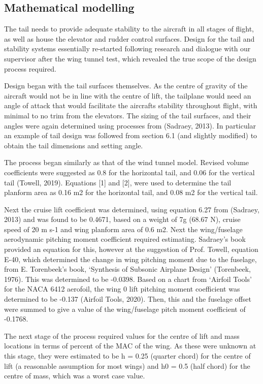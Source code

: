 \documentclass[../../main.tex]{subfiles}
\begin{document}
\subsection{Mathematical modelling} \label{sec:final-design-proposal:tail:mathematical-modelling}

The tail needs to provide adequate stability to the aircraft in all stages of flight, as well as house the elevator and rudder control surfaces.
Design for the tail and stability systems essentially re-started following research and dialogue with our supervisor after the wing tunnel test, which revealed the true scope of the design process required. 

Design began with the tail surfaces themselves.
As the centre of gravity of the aircraft would not be in line with the centre of lift, the tailplane would need an angle of attack that would facilitate the aircrafts stability throughout flight, with minimal to no trim from the elevators.
The sizing of the tail surfaces, and their angles were again determined using processes from (Sadraey, 2013).
In particular an example of tail design was followed from section 6.1 (and slightly modified) to obtain the tail dimensions and setting angle. 

The process began similarly as that of the wind tunnel model.
Revised volume coefficients were suggested as 0.8 for the horizontal tail, and 0.06 for the vertical tail (Towell, 2019).
Equations [1] and [2], were used to determine the tail planform area as 0.16 m2 for the horizontal tail, and 0.08 m2 for the vertical tail.  

Next the cruise lift coefficient was determined, using equation 6.27 from (Sadraey, 2013) and was found to be 0.4671, based on a weight of 7g (68.67 N), cruise speed of 20 m s-1 and wing planform area of 0.6 m2.
Next the wing/fuselage aerodynamic pitching moment coefficient required estimating.
Sadraey’s book provided an equation for this, however at the suggestion of Prof. Towell, equation E-40, which determined the change in wing pitching moment due to the fuselage, from E. Torenbeek’s book, ‘Synthesis of Subsonic Airplane Design’ (Torenbeek, 1976).
This was determined to be -0.0398.
Based on a chart from ‘Airfoil Tools’ for the NACA 6412 aerofoil, the wing 0 lift pitching moment coefficient was determined to be -0.137 (Airfoil Tools, 2020).
Then, this and the fuselage offset were summed to give a value of the wing/fuselage pitch moment coefficient of -0.1768. 

The next stage of the process required values for the centre of lift and mass locations in terms of percent of the MAC of the wing.
As these were unknown at this stage, they were estimated to be h = 0.25 (quarter chord) for the centre of lift (a reasonable assumption for most wings) and h0 = 0.5 (half chord) for the centre of mass, which was a worst case value. 
\end{document}
